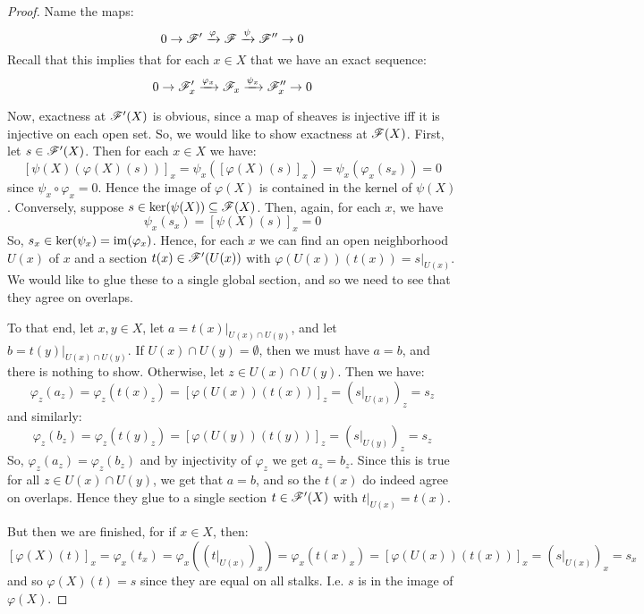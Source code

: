 \begin{proof}
	Name the maps:
	\[ 0 \to \mathscr{F}' \xrightarrow{\varphi} \mathscr{F} \xrightarrow{\psi} \mathscr{F}'' \to 0 \]
	Recall that this implies that for each $x \in X$ that we have an exact sequence:
	\[ 0 \to \mathscr{F}'_x \xrightarrow{\varphi_x} \mathscr{F}_x \xrightarrow{\psi_x} \mathscr{F}''_x \to 0 \]
	
	Now, exactness at $\mathscr{F}'(X)$ is obvious, since a map of sheaves is injective iff it is injective on each open set. So, we would like to show exactness at $\mathscr{F}(X)$. First, let $s \in \mathscr{F}'(X)$. Then for each $x \in X$ we have:
	\[ [\psi(X)(\varphi(X)(s))]_x = \psi_x([\varphi(X)(s)]_x) = \psi_x(\varphi_x(s_x)) = 0 \]
	since $\psi_x \circ \varphi_x = 0$. Hence the image of $\varphi(X)$ is contained in the kernel of $\psi(X)$. Conversely, suppose $s \in \ker(\psi(X)) \subseteq \mathscr{F}(X)$. Then, again, for each $x$, we have
	\[ \psi_x(s_x) = [\psi(X)(s)]_x = 0 \]
	So, $s_x \in \ker(\psi_x) = \operatorname{im}(\varphi_x)$. Hence, for each $x$ we can find an open neighborhood $U(x)$ of $x$ and a section $t(x) \in \mathscr{F}'(U(x))$ with $\varphi(U(x))(t(x)) = s|_{U(x)}$. We would like to glue these to a single global section, and so we need to see that they agree on overlaps.
	
	To that end, let $x,y \in X$, let $a = t(x)|_{U(x) \cap U(y)}$, and let $b = t(y)|_{U(x) \cap U(y)}$. If $U(x) \cap U(y) = \emptyset$, then we must have $a = b$, and there is nothing to show. Otherwise, let $z \in U(x) \cap U(y)$. Then we have:
	\[ \varphi_z(a_z) = \varphi_z(t(x)_z) = [\varphi(U(x))(t(x))]_z = (s|_{U(x)})_z = s_z \]
	and similarly:
	\[ \varphi_z(b_z) = \varphi_z(t(y)_z) = [\varphi(U(y))(t(y))]_z = (s|_{U(y)})_z = s_z \]
	So, $\varphi_z(a_z) = \varphi_z(b_z)$ and by injectivity of $\varphi_z$ we get $a_z = b_z$. Since this is true for all $z \in U(x) \cap U(y)$, we get that $a=b$, and so the $t(x)$ do indeed agree on overlaps. Hence they glue to a single section $t \in \mathscr{F}'(X)$ with $t|_{U(x)} = t(x)$.
	
	But then we are finished, for if $x \in X$, then:
	\[ [\varphi(X)(t)]_x = \varphi_x(t_x) = \varphi_x((t|_{U(x)})_x) = \varphi_x(t(x)_x) = [\varphi(U(x))(t(x))]_x = (s|_{U(x)})_x = s_x \]
	and so $\varphi(X)(t) = s$ since they are equal on all stalks. I.e. $s$ is in the image of $\varphi(X)$.
\end{proof}
